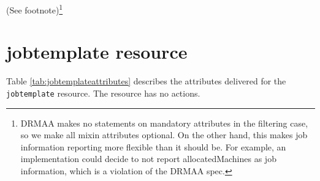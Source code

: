 \documentclass[10pt]{article}
\newcommand{\h}[1]{\lstinline|#1|}
\newcommand{\rat}[1]{ {\tiny(See footnote)}\footnote{#1} }
\begin{document}
\rat{DRMAA makes no statements on mandatory attributes in the filtering case, so we make all mixin attributes optional. On the other hand, this makes job information reporting more flexible than it should be. For example, an implementation could decide to not report allocatedMachines as job information, which is a violation of the DRMAA spec.}


\section{jobtemplate resource}

Table \ref{tab:jobtemplateattributes} describes the attributes delivered for the \h{jobtemplate} resource. The resource has no actions.
\end{document}
